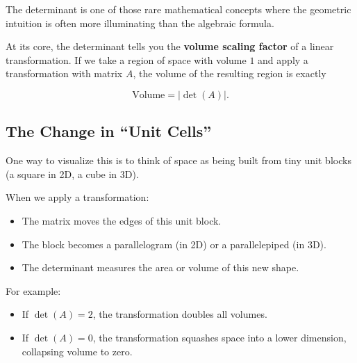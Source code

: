 \documentclass[11pt,openany]{book}
\theoremstyle{definition}
\begin{document}
The determinant is one of those rare mathematical concepts where the geometric intuition is often more illuminating than the algebraic formula.

\medskip

At its core, the determinant tells you the \textbf{volume scaling factor} of a linear transformation.
If we take a region of space with volume $1$ and apply a transformation with matrix $A$,
the volume of the resulting region is exactly

\[
\text{Volume} = |\det(A)|.
\]

\medskip

\subsection{The Change in ``Unit Cells''}

One way to visualize this is to think of space as being built from tiny unit blocks
(a square in 2D, a cube in 3D).

\medskip

When we apply a transformation:

\begin{itemize}
  \item The matrix moves the edges of this unit block.
  \item The block becomes a parallelogram (in 2D) or a parallelepiped (in 3D).
  \item The determinant measures the area or volume of this new shape.
\end{itemize}

\medskip

For example:

\begin{itemize}
  \item If $\det(A) = 2$, the transformation doubles all volumes.
  \item If $\det(A) = 0$, the transformation squashes space into a lower dimension,
  collapsing volume to zero.
\end{itemize}
\end{document}
